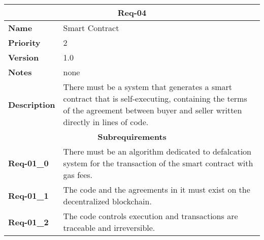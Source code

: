 \documentclass{article}
\begin{document}
\bgroup{}
\def\arraystretch{1.25}
\begin{center}
    \begin{tabular}{ |l|p{9cm}| }
        \hline
        \multicolumn{2}{|c|}{\textbf{Req-04}} \\
        \hline
        \textbf{Name} & Smart Contract \\
        \hline
        \textbf{Priority} & 2 \\
        \hline
        \textbf{Version} & 1.0 \\
        \hline
        \textbf{Notes} & none \\
        \hline
        \textbf{Description} & There must be a system that generates a smart contract that is self-executing, containing the terms of the agreement between buyer and seller written directly in lines of code. \\
        \hline
        \multicolumn{2}{|c|}{\textbf{Subrequirements}} \\
        \hline
        \textbf{Req-01\_0} & There must be an algorithm dedicated to defalcation system for the transaction of the smart contract with gas fees. \\
        \hline
        \textbf{Req-01\_1} & The code and the agreements in it must exist on the decentralized blockchain. \\
        \hline
        \textbf{Req-01\_2} & The code controls execution and transactions are traceable and irreversible. \\
        \hline
    \end{tabular}
\end{center}
\egroup{}
\end{document}
